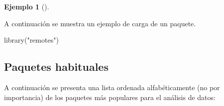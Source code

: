 \documentclass[
  a4paper,
]{scrreport}
\newenvironment{Shaded}{\begin{snugshade}}{\end{snugshade}}
\newcommand{\FunctionTok}[1]{\textcolor[rgb]{0.28,0.35,0.67}{#1}}
\newcommand{\NormalTok}[1]{\textcolor[rgb]{0.00,0.23,0.31}{#1}}
\newcommand{\StringTok}[1]{\textcolor[rgb]{0.13,0.47,0.30}{#1}}
\theoremstyle{definition}
\newtheorem{example}{Ejemplo}[chapter]
\theoremstyle{definition}
\theoremstyle{remark}
\begin{document}
\leavevmode{}%
\begin{example}[]\label{exm-carga-paquetes}

A continuación se muestra un ejemplo de carga de un paquete.

\begin{Shaded}
\begin{Highlighting}[]
\FunctionTok{library}\NormalTok{(}\StringTok{"remotes"}\NormalTok{)}
\end{Highlighting}
\end{Shaded}

\end{example}

\hypertarget{paquetes-habituales}{%
\subsection{Paquetes habituales}\label{paquetes-habituales}}

A continuación se presenta una lista ordenada alfabéticamente (no por
importancia) de los paquetes más populares para el análisis de datos:
\end{document}
